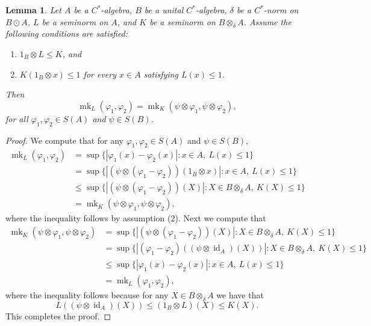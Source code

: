 \documentclass[11pt, a4paper, oneside, final, reqno]{amsart}
\newcommand{\id}{\operatorname{id}}
\newcommand{\mk}{\operatorname{mk}}
\theoremstyle{definition}
\theoremstyle{plain}
\newtheorem{lemma}[definition]{Lemma}
\theoremstyle{remark}
\numberwithin{equation}{section}
\begin{document}
\begin{lemma}\label{lemma:sufficient condition for stability}
    Let $A$ be a $C^*$-algebra, $B$ be a unital $C^*$-algebra, $\delta$ be a $C^*$-norm on $B \odot A$, $L$ be a seminorm on $A$, and $K$ be a seminorm on $B \otimes_{\delta} A$. Assume the following conditions are satisfied:
    \begin{enumerate}
        \item $1_B \otimes L \leq K$, and
        \item $K(1_B \otimes x) \leq 1$ for every $x \in A$ satisfying $L(x) \leq 1$.
    \end{enumerate}
    Then
    \begin{equation}\label{eqn:stability technical lemma}
        \mk_L(\varphi_1, \varphi_2) = \mk_{K}(\psi \otimes \varphi_1, \psi \otimes \varphi_2),
    \end{equation}
    for all $\varphi_1, \varphi_2 \in S(A)$ and $\psi \in S(B)$.
\end{lemma}
\begin{proof}
    We compute that for any $\varphi_1, \varphi_2 \in S(A)$ and $\psi \in S(B)$,
    \begin{align*}
        \mk_{L}(\varphi_1, \varphi_2)
        & = \sup\{ |\varphi_1(x) - \varphi_2(x)| \colon x \in A, \ L(x) \leq 1 \} \\
        & = \sup\{ |(\psi \otimes (\varphi_1 - \varphi_2))(1_B \otimes x)| \colon x \in A, \ L(x) \leq 1 \} \\
        & \leq \sup\{ |(\psi \otimes (\varphi_1 - \varphi_2))(X)| \colon X \in B \otimes_{\delta} A, \ K(X) \leq 1 \} \\
        & = \mk_{K}(\psi \otimes \varphi_1, \psi \otimes \varphi_2),
    \end{align*}
    where the inequality follows by assumption (2). Next we compute that
    \begin{align*}
        \mk_{K}(\psi \otimes \varphi_1, \psi \otimes \varphi_2)
        & = \sup\{ |(\psi \otimes (\varphi_1 - \varphi_2))(X)| \colon X \in B \otimes_{\delta} A, \ K(X) \leq 1 \} \\
        & = \sup\{ |(\varphi_1 - \varphi_2)((\psi \otimes \id_A)(X))| \colon X \in B \otimes_{\delta} A, \ K(X) \leq 1 \} \\
        & \leq \sup\{ |\varphi_1(x) - \varphi_2(x)| \colon x \in A, \ L(x) \leq 1 \} \\
        & = \mk_{L}(\varphi_1, \varphi_2),
    \end{align*}
    where the inequality follows because for any $X \in B \otimes_{\delta} A$ we have that
    \begin{equation*}
        L((\psi \otimes \id_A)(X)) \leq (1_B \otimes L)(X) \leq K(X).
    \end{equation*}
    This completes the proof.
\end{proof}
\end{document}
